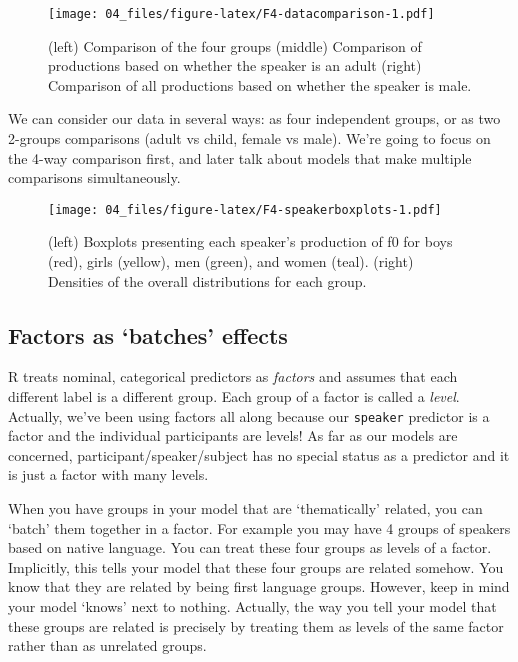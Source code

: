 \documentclass[
]{book}
\begin{document}
\begin{figure}
\centering
\texttt{[image: 04\_files/figure-latex/F4-datacomparison-1.pdf]}
\caption{\label{fig:F4-datacomparison}(left) Comparison of the four groups (middle) Comparison of productions based on whether the speaker is an adult (right) Comparison of all productions based on whether the speaker is male.}
\end{figure}

We can consider our data in several ways: as four independent groups, or as two 2-groups comparisons (adult vs child, female vs male). We're going to focus on the 4-way comparison first, and later talk about models that make multiple comparisons simultaneously.

\begin{figure}
\centering
\texttt{[image: 04\_files/figure-latex/F4-speakerboxplots-1.pdf]}
\caption{\label{fig:F4-speakerboxplots}(left) Boxplots presenting each speaker's production of f0 for boys (red), girls (yellow), men (green), and women (teal). (right) Densities of the overall distributions for each group.}
\end{figure}

\hypertarget{factors-as-batches-effects}{%
\subsection{Factors as `batches' effects}\label{factors-as-batches-effects}}

R treats nominal, categorical predictors as \emph{factors} and assumes that each different label is a different group. Each group of a factor is called a \emph{level}. Actually, we've been using factors all along because our \texttt{speaker} predictor is a factor and the individual participants are levels! As far as our models are concerned, participant/speaker/subject has no special status as a predictor and it is just a factor with many levels.

When you have groups in your model that are `thematically' related, you can `batch' them together in a factor. For example you may have 4 groups of speakers based on native language. You can treat these four groups as levels of a factor. Implicitly, this tells your model that these four groups are related somehow. You know that they are related by being first language groups. However, keep in mind your model `knows' next to nothing. Actually, the way you tell your model that these groups are related is precisely by treating them as levels of the same factor rather than as unrelated groups.
\end{document}
